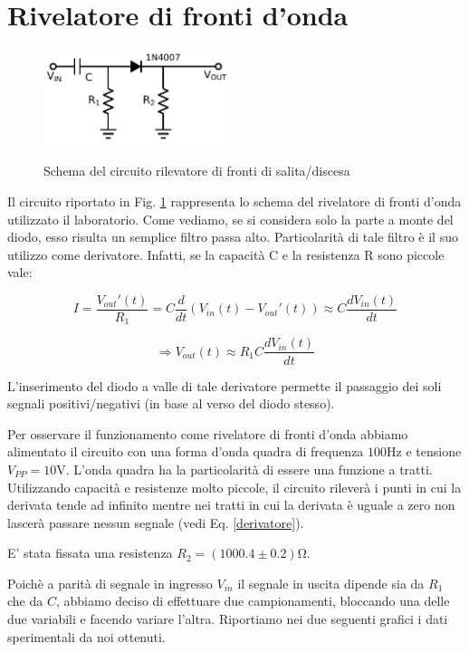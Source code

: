 \section{Rivelatore di fronti d'onda}
\begin{figure}
	\caption{Schema del circuito rilevatore di fronti di salita/discesa}
	\includegraphics[width=54mm]{schema_peak_detector.pdf}
	\label{fig:schema_peak_detector}
\end{figure}

Il circuito riportato in Fig. \ref{fig:schema_peak_detector} rappresenta lo schema del rivelatore di fronti d'onda utilizzato il laboratorio. Come vediamo, se si considera solo la parte a monte del diodo, esso risulta un semplice filtro passa alto. Particolarità di tale filtro è il suo utilizzo come derivatore. Infatti, se la capacità C e la resistenza R sono piccole vale:

$$ I=\frac{V_{out}'(t)}{R_1}=C\frac{d}{dt}(V_{in}(t)-V_{out}'(t)) \approx C \frac{dV_{in}(t)}{dt} $$

\begin{equation} 
\Rightarrow V_{out}(t) \approx R_1C \frac{dV_{in}(t)}{dt} 
\label{derivatore}
\end{equation}

L'inserimento del diodo a valle di tale derivatore permette il passaggio dei soli segnali positivi/negativi (in base al verso del diodo stesso).

Per osservare il funzionamento come rivelatore di fronti d'onda abbiamo alimentato il circuito con una forma d'onda quadra di frequenza $100 \si{\hertz}$ e tensione $V_{PP}=10 \si{\volt}$. L'onda quadra ha la particolarità di essere una funzione a tratti. Utilizzando capacità e resistenze molto piccole, il circuito rileverà i punti in cui la derivata tende ad infinito mentre nei tratti in cui la derivata è uguale a zero non lascerà passare nessun segnale (vedi Eq. \ref{derivatore}).

E' stata fissata una resistenza $R_2=(1000.4 \pm 0.2) \si{\ohm}$. 

Poichè a parità di segnale in ingresso $V_{in}$ il segnale in uscita dipende sia da $R_1$ che da $C$, abbiamo deciso di effettuare due campionamenti, bloccando una delle due variabili e facendo variare l'altra. Riportiamo nei due seguenti grafici i dati sperimentali da noi ottenuti.

